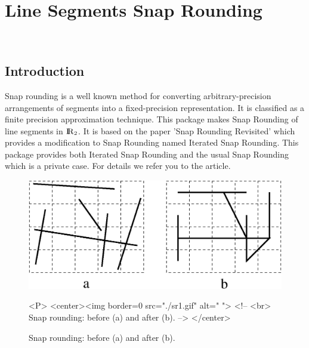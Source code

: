
\ccParDims


\chapter{Line Segments Snap Rounding}
\label{chapterSnapRoundibg}
\\
\newcommand{\reals}{{\rm I\!\hspace{-0.025em} R}}
\def\A{{\cal A}}
\def\S{{\cal S}}

\section{Introduction}
Snap rounding is a well known method for converting
arbitrary-precision arrangements of segments into a fixed-precision
representation. It is classified as a finite precision approximation 
technique. This package makes Snap Rounding of line segments in $\reals_2$.
It is based on the paper 'Snap Rounding Revisited' which provides a modification
to Snap Rounding named Iterated Snap Rounding. This package provides both
Iterated Snap Rounding and the usual Snap Rounding which is a private case.
For details we refer you to the article.

\begin{figure}
\begin{center}
\begin{ccTexOnly}
{\centering \resizebox*{0.4\textwidth}{0.15\textheight}%
 {\includegraphics{sr1.ps}}
}
\end{ccTexOnly}
\caption{Snap rounding: before (a) and after (b).\label{fig:sr1}}
\begin{ccHtmlOnly}
<P>
<center><img border=0 src="./sr1.gif" alt=" ">
<!--
<br>
Snap rounding: before (a) and after (b).
-->
</center>
\end{ccHtmlOnly}
\end{center}
\end{figure}

